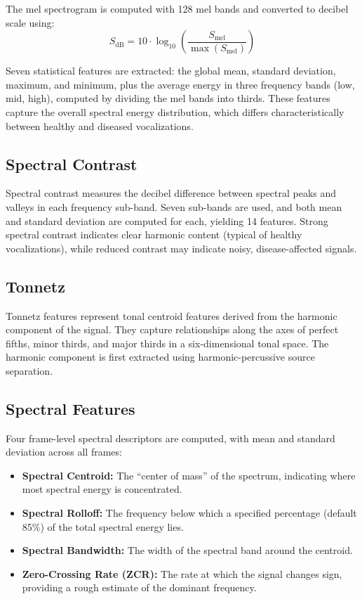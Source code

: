 \documentclass[12pt,a4paper]{report}
\begin{document}
The mel spectrogram is computed with 128 mel bands and converted to decibel scale using:
\begin{equation}
    S_{\text{dB}} = 10 \cdot \log_{10}\left(\frac{S_{\text{mel}}}{\max(S_{\text{mel}})}\right)
\end{equation}

Seven statistical features are extracted: the global mean, standard deviation, maximum, and minimum, plus the average energy in three frequency bands (low, mid, high), computed by dividing the mel bands into thirds. These features capture the overall spectral energy distribution, which differs characteristically between healthy and diseased vocalizations.

\subsection{Spectral Contrast}

Spectral contrast measures the decibel difference between spectral peaks and valleys in each frequency sub-band. Seven sub-bands are used, and both mean and standard deviation are computed for each, yielding 14 features. Strong spectral contrast indicates clear harmonic content (typical of healthy vocalizations), while reduced contrast may indicate noisy, disease-affected signals.

\subsection{Tonnetz}

Tonnetz features represent tonal centroid features derived from the harmonic component of the signal. They capture relationships along the axes of perfect fifths, minor thirds, and major thirds in a six-dimensional tonal space. The harmonic component is first extracted using harmonic-percussive source separation.

\subsection{Spectral Features}

Four frame-level spectral descriptors are computed, with mean and standard deviation across all frames:
\begin{itemize}
    \item \textbf{Spectral Centroid:} The ``center of mass'' of the spectrum, indicating where most spectral energy is concentrated.
    \item \textbf{Spectral Rolloff:} The frequency below which a specified percentage (default 85\%) of the total spectral energy lies.
    \item \textbf{Spectral Bandwidth:} The width of the spectral band around the centroid.
    \item \textbf{Zero-Crossing Rate (ZCR):} The rate at which the signal changes sign, providing a rough estimate of the dominant frequency.
\end{itemize}
\end{document}
